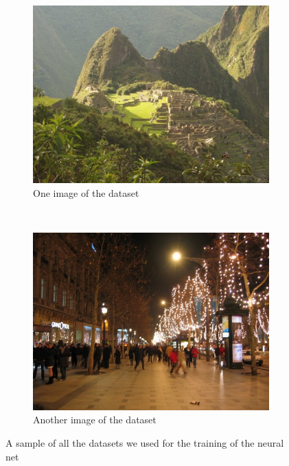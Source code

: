 \documentclass[11pt]{report}
\begin{document}
\begin{figure}
	\centering
	\begin{subfigure}[b]{0.45\textwidth}
		\includegraphics[width=\textwidth]{../iaprtc12/images/24/24019.jpg}
		\caption{One image of the dataset}
		\label{img1}
	\end{subfigure}
	~
	\begin{subfigure}[b]{0.45\textwidth}
		\includegraphics[width=\textwidth]{../iaprtc12/images/37/37142.jpg}
		\caption{Another image of the dataset}
		\label{img2}
	\end{subfigure}
	
	\caption{A sample of all the datasets we used for the training of the neural net}
	\label{fig:IAPR-database}
\end{figure}
\end{document}
